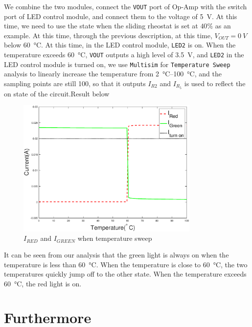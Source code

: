\documentclass[12pt]{article}
\numberwithin{equation}{section}
\begin{document}
We combine the two modules, connect the \verb|VOUT| port of Op-Amp with the switch port of LED control module, and connect them to the voltage of \qty{5}{V}. At this time, we need to use the state when the sliding rheostat is set at $40\%$ as an example. At this time, through the previous description, at this time, $V_{OUT}=\qty{0}{V}$ below \qty{60}{\degreeCelsius}. At this time, in the LED control module, \verb|LED2| is on. When the temperature exceeds \qty{60}{\degreeCelsius}, \verb|VOUT| outputs a high level of \qty{3.5}{V}, and \verb|LED2| in the LED control module is turned on, we use \verb|Multisim| for \verb|Temperature Sweep| analysis to linearly increase the temperature from \qtyrange{2}{100}{\degreeCelsius}, and the sampling points are still \num{100}, so that it outputs $I_{R2}$ and $I_{R_5}$ is used to reflect the on state of the circuit.Result below



\begin{figure}[H] %
\centering %
\includegraphics[width=0.8\textwidth]{total_sweep} %
\caption{$I_{RED}$ and $I_{GREEN}$ when temperature sweep} %
\label{Fig.temperature_sweep_diagram} %
\end{figure}


It can be seen from our analysis that the green light is always on when the temperature is less than \qty{60}{\degreeCelsius}. When the temperature is close to \qty{60}{\degreeCelsius}, the two temperatures quickly jump off to the other state. When the temperature exceeds  \qty{60}{\degreeCelsius}, the red light is on.


\section{Furthermore}
\end{document}
